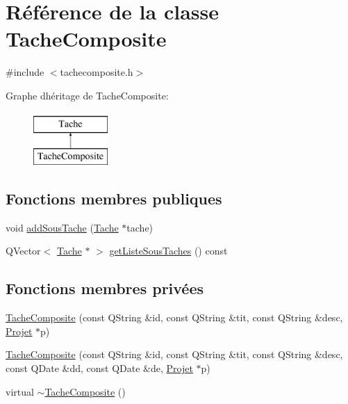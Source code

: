 \hypertarget{class_tache_composite}{}\section{Référence de la classe Tache\+Composite}
\label{class_tache_composite}


{\ttfamily \#include $<$tachecomposite.\+h$>$}

Graphe d\textquotesingle{}héritage de Tache\+Composite\+:\begin{figure}[H]
\begin{center}
\leavevmode
\includegraphics[height=2.000000cm]{class_tache_composite}
\end{center}
\end{figure}
\subsection*{Fonctions membres publiques}
\begin{DoxyCompactItemize}
\item 
void \hyperlink{class_tache_composite_ab4243a926687c17556eeaa34ecbe1567}{add\+Sous\+Tache} (\hyperlink{class_tache}{Tache} $\ast$tache)
\item 
Q\+Vector$<$ \hyperlink{class_tache}{Tache} $\ast$ $>$ \hyperlink{class_tache_composite_a4c7408084fe783835b083501757a1c19}{get\+Liste\+Sous\+Taches} () const 
\end{DoxyCompactItemize}
\subsection*{Fonctions membres privées}
\begin{DoxyCompactItemize}
\item 
\hyperlink{class_tache_composite_a3042d6bf7df70fe0e56f314224fbae53}{Tache\+Composite} (const Q\+String \&id, const Q\+String \&tit, const Q\+String \&desc, \hyperlink{class_projet}{Projet} $\ast$p)
\item 
\hyperlink{class_tache_composite_a073e2621c0bc6cf8e61e2ef6f5e938eb}{Tache\+Composite} (const Q\+String \&id, const Q\+String \&tit, const Q\+String \&desc, const Q\+Date \&dd, const Q\+Date \&de, \hyperlink{class_projet}{Projet} $\ast$p)
\item 
virtual \hyperlink{class_tache_composite_a70ddee42aa910b22a06e8197f5873698}{$\sim$\+Tache\+Composite} ()
\end{DoxyCompactItemize}
